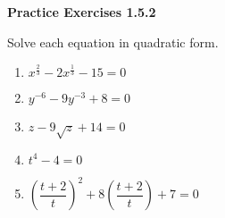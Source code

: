 \noindent\textbf{Practice Exercises 1.5.2}

\vspace{0.75ex}

Solve each equation in quadratic form. 
\begin{multicols}{2}
\begin{enumerate}[label = \color{blue}\arabic*. ]
   \item $ x^{\tfrac{2}{3}} - 2x^{\tfrac{1}{3}} - 15 = 0 $
%
   \item $ y^{-6} - 9y^{-3} + 8 = 0 $
   \item $ z - 9\sqrt{z} + 14 = 0 $
   \item $ t^{4} - 4 = 0 $
   \item $ \left(\dfrac{t+2}{t}\right)^{2} + 8\left(\dfrac{t+2}{t}\right) + 7 = 0 $
\end{enumerate}
\end{multicols} 